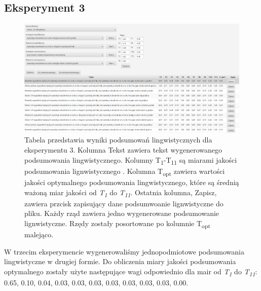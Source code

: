 \documentclass{classrep}
\begin{document}
\subsection{Eksperyment 3}
\label{section:ex3}
\begin{figure}[h!]
\centering
\includegraphics[width=15cm]{ex3.png}
\vspace{-0.3cm}
\caption{Tabela przedstawia wyniki podsumowań lingwistycznych dla eksperymentu 3. Kolumna Tekst zawiera tekst wygenerowanego podsumowania lingwistycznego. Kolumny  T\textsubscript{1}-T\textsubscript{11} są miarami jakości podsumowania lignwistycznego \cite{niewiadomski19}. Kolumna T\textsubscript{opt} zawiera wartości jakości optymalnego podsumowania lingwistycznego, które są średnią ważoną miar jakości od \textit{T\textsubscript{1}} do \textit{T\textsubscript{11}}. Ostatnia kolumna, Zapisz, zawiera przcisk zapisujący dane podsumwoanie lignwistyczne do pliku. Każdy rząd zawiera jedno wygenerowane podsumowanie lignwistyczne. Rzędy zostały posortowane po kolumnie T\textsubscript{opt} malejąco. }
\label{ex3}
\end{figure}

W trzecim eksperymencie wygenerowaliśmy jednopodmiotowe podsumowania lingwistyczne w drugiej formie. Do obliczenia miary jakości podsumowania optymalnego zostały użyte następujące wagi odpowiednio dla mair od \textit{T\textsubscript{1}} do \textit{T\textsubscript{11}}: 0.65, 0.10, 0.04, 0.03, 0.03, 0.03, 0.03, 0.03, 0.03, 0.03, 0.00.
\end{document}
